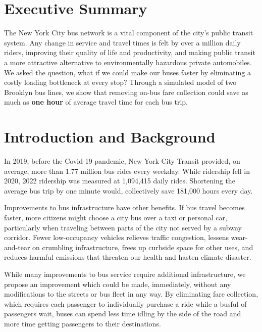 \documentclass[12pt]{article}
\title{}
\author{Morgan Wajda-Levie}
\begin{document}
\maketitle

\section{Executive Summary}

The New York City bus network is a vital component of the city's public
transit system. Any change in service and travel times is felt by over a
million daily riders, improving their quality of life and productivity, and
making public transit a more attractive alternative to environmentally
hazardous private automobiles. We asked the question, what if we could make
our buses faster by eliminating a costly loading bottleneck at every stop?
Through a simulated model of two Brooklyn bus lines, we show that removing
on-bus fare collection could save as much as \textbf{one hour} of average
travel time for each bus trip.

\section{Introduction and Background}

In 2019, before the Covid-19 pandemic, New York City Transit provided, on
average, more than 1.77 million bus rides every weekday. While ridership fell
in 2020, 2022 ridership was measured at 1,094,415 daily rides\cite{mta}.
Shortening the average bus trip by one minute would, collectively save
181,000 hours every day.

Improvements to bus infrastructure have other benefits. If bus travel becomes
faster, more citizens might choose a city bus over a taxi or personal car,
particularly when traveling between parts of the city not served by a subway
corridor. Fewer low-occupancy vehicles relieves traffic congestion, lessens
wear-and-tear on crumbling infrastructure, frees up curbside space for other
uses, and reduces harmful emissions that threaten our health and hasten
climate disaster.

While many improvements to bus service require additional infrastructure,
we propose an improvement which could be made, immediately, without any
modifications to the streets or bus fleet in any way. By eliminating fare
collection, which requires each passenger to individually purchase a ride
while a busful of passengers wait, buses can spend less time idling by the
side of the road and more time getting passengers to their destinations.
\end{document}
